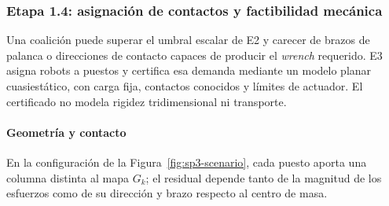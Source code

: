 \subsubsection{Etapa 1.4: asignación de contactos y factibilidad mecánica}
\label{subsubsec:sp1-contacts}



Una coalición puede superar el umbral escalar de E2 y carecer de brazos de palanca o direcciones de contacto capaces de producir el \emph{wrench} requerido. E3 asigna robots a puestos y certifica esa demanda mediante un modelo planar cuasiestático, con carga fija, contactos conocidos y límites de actuador. El certificado no modela rigidez tridimensional ni transporte.

\paragraph{Geometría y contacto}

En la configuración de la Figura~\ref{fig:sp3-scenario}, cada puesto aporta una columna distinta al mapa $G_k$; el residual depende tanto de la magnitud de los esfuerzos como de su dirección y brazo respecto al centro de masa.

